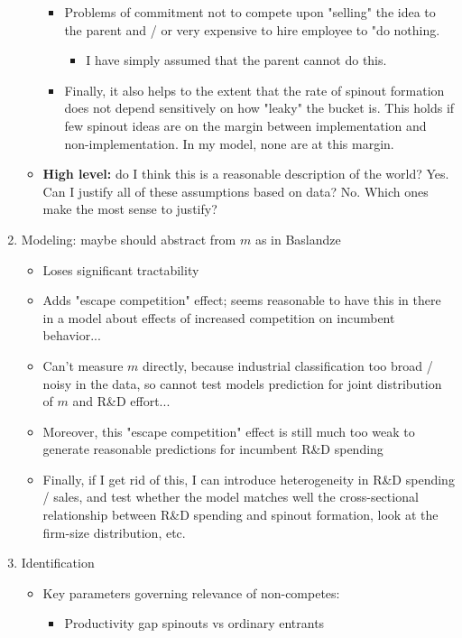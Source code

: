\documentclass[12pt,english]{article}
\theoremstyle{remark}
\begin{document}
\begin{enumerate}
\begin{itemize}
\begin{itemize}
\begin{itemize}
			\end{itemize}
			\item Problems of commitment not to compete upon "selling" the idea to the parent and / or very expensive to hire employee to "do nothing.
			\begin{itemize}
				\item I have simply assumed that the parent cannot do this.
			\end{itemize}
			\item Finally, it also helps to the extent that the rate of spinout formation does not depend sensitively on how "leaky" the bucket is. This holds if few spinout ideas are on the margin between implementation and non-implementation. In my model, none are at this margin.
		\end{itemize}
		\item \textbf{High level:} do I think this is a reasonable description of the world? Yes. Can I justify all of these assumptions based on data? No. Which ones make the most sense to justify?
	\end{itemize}
	\item Modeling: maybe should abstract from $m$ as in Baslandze 
	\begin{itemize}
		\item Loses significant tractability
		\item Adds "escape competition" effect; seems reasonable to have this in there in a model about effects of increased competition on incumbent behavior...
		\item Can't measure $m$ directly, because industrial classification too broad / noisy in the data, so cannot test models prediction for joint distribution of $m$ and R\&D effort...
		\item Moreover, this "escape competition" effect is still much too weak to generate reasonable predictions for incumbent R\&D spending
		\item Finally, if I get rid of this, I can introduce heterogeneity in R\&D spending / sales, and test whether the model matches well the cross-sectional relationship between R\&D spending and spinout formation, look at the firm-size distribution, etc.
	\end{itemize}
	\item Identification
	\begin{itemize}
		\item Key parameters governing relevance of non-competes:
		\begin{itemize}
			\item Productivity gap spinouts vs ordinary entrants

\end{itemize}
\end{itemize}
\end{enumerate}
\end{document}
